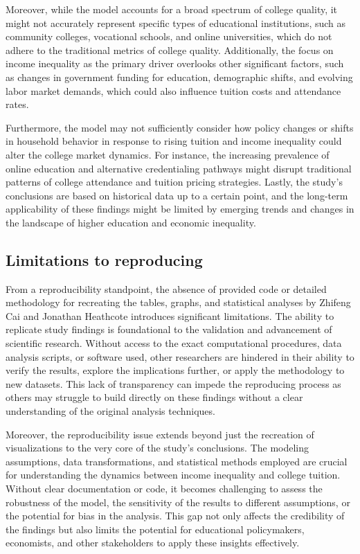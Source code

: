 \documentclass[
  letterpaper,
  DIV=11,
  numbers=noendperiod]{scrartcl}
\begin{document}
Moreover, while the model accounts for a broad spectrum of college
quality, it might not accurately represent specific types of educational
institutions, such as community colleges, vocational schools, and online
universities, which do not adhere to the traditional metrics of college
quality. Additionally, the focus on income inequality as the primary
driver overlooks other significant factors, such as changes in
government funding for education, demographic shifts, and evolving labor
market demands, which could also influence tuition costs and attendance
rates.

Furthermore, the model may not sufficiently consider how policy changes
or shifts in household behavior in response to rising tuition and income
inequality could alter the college market dynamics. For instance, the
increasing prevalence of online education and alternative credentialing
pathways might disrupt traditional patterns of college attendance and
tuition pricing strategies. Lastly, the study's conclusions are based on
historical data up to a certain point, and the long-term applicability
of these findings might be limited by emerging trends and changes in the
landscape of higher education and economic inequality.

\subsection{Limitations to
reproducing}\label{limitations-to-reproducing}

From a reproducibility standpoint, the absence of provided code or
detailed methodology for recreating the tables, graphs, and statistical
analyses by Zhifeng Cai and Jonathan Heathcote introduces significant
limitations. The ability to replicate study findings is foundational to
the validation and advancement of scientific research. Without access to
the exact computational procedures, data analysis scripts, or software
used, other researchers are hindered in their ability to verify the
results, explore the implications further, or apply the methodology to
new datasets. This lack of transparency can impede the reproducing
process as others may struggle to build directly on these findings
without a clear understanding of the original analysis techniques.

Moreover, the reproducibility issue extends beyond just the recreation
of visualizations to the very core of the study's conclusions. The
modeling assumptions, data transformations, and statistical methods
employed are crucial for understanding the dynamics between income
inequality and college tuition. Without clear documentation or code, it
becomes challenging to assess the robustness of the model, the
sensitivity of the results to different assumptions, or the potential
for bias in the analysis. This gap not only affects the credibility of
the findings but also limits the potential for educational policymakers,
economists, and other stakeholders to apply these insights effectively.
\end{document}
